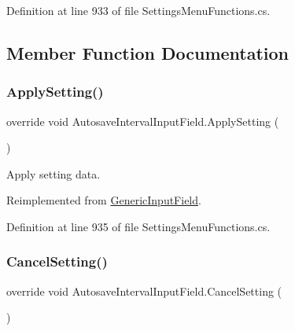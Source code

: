 Definition at line 933 of file Settings\+Menu\+Functions.\+cs.



\subsection{Member Function Documentation}
\mbox{\label{class_autosave_interval_input_field_aa1c438429994349876cc778f3280a01c}} 
\subsubsection{\texorpdfstring{Apply\+Setting()}{ApplySetting()}}
{\footnotesize\ttfamily override void Autosave\+Interval\+Input\+Field.\+Apply\+Setting (\begin{DoxyParamCaption}{ }\end{DoxyParamCaption})\hspace{0.3cm}{\ttfamily [virtual]}}



Apply setting data. 



Reimplemented from \hyperlink{class_generic_input_field_a97f9b49ecff8b1f6a8c837428c46ef27}{Generic\+Input\+Field}.



Definition at line 935 of file Settings\+Menu\+Functions.\+cs.

\mbox{\label{class_autosave_interval_input_field_a6c8ac107fc15d34c30e2a8f3709d2a5d}} 
\subsubsection{\texorpdfstring{Cancel\+Setting()}{CancelSetting()}}
{\footnotesize\ttfamily override void Autosave\+Interval\+Input\+Field.\+Cancel\+Setting (\begin{DoxyParamCaption}{ }\end{DoxyParamCaption})\hspace{0.3cm}{\ttfamily [virtual]}}



